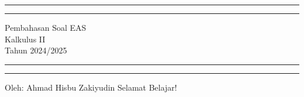 \documentclass[10pt,openany,a4paper]{article}
\theoremstyle{definition}
\theoremstyle{definition}
\theoremstyle{plain}
\begin{document}
\begin{titlepage}
	\centering %
	\vspace*{1.5\baselineskip} %

	\rule{13cm}{1.6pt}\vspace*{-\baselineskip}\vspace*{2pt} %
	\rule{13cm}{0.4pt} %
	
		\vspace{0.75\baselineskip} %
	{	\Huge Pembahasan Soal EAS\\ 
			\vspace{4mm}
		Kalkulus II \\ \vspace{2mm} \huge{Tahun 2024/2025}\\	}
		\vspace{0.75\baselineskip} %
	\rule{13cm}{0.4pt}\vspace*{-\baselineskip}\vspace{3.2pt} %
	\rule{13cm}{1.6pt} %
	
		\vspace{1.75\baselineskip} %
{\large Oleh: Ahmad Hisbu Zakiyudin}
	\vfill
	\vspace{1mm}
\huge{Selamat Belajar!}
\end{titlepage}
\makeatletter
\setlength\fboxsep{3pt}
\setlength{\headheight}{24pt}
\end{document}
